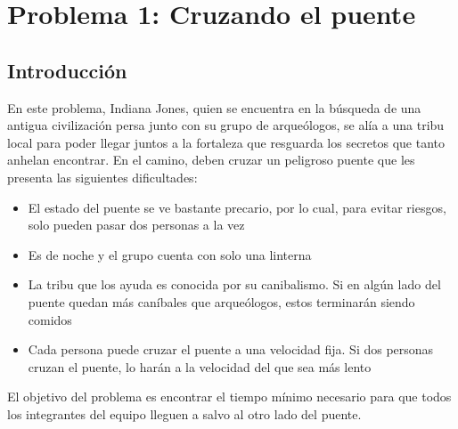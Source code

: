 \section{Problema 1: Cruzando el puente}

\subsection{Introducción}
	En este problema, Indiana Jones, quien se encuentra en la búsqueda de una antigua civilización persa junto con su grupo de arqueólogos, se alía a una tribu local para poder llegar juntos a la fortaleza que resguarda los secretos que tanto anhelan encontrar. En el camino, deben cruzar un peligroso puente que les presenta las siguientes dificultades:
	\begin{itemize}
	\item El estado del puente se ve bastante precario, por lo cual, para evitar riesgos, solo pueden pasar dos personas a la vez
	\item Es de noche y el grupo cuenta con solo una linterna
	\item La tribu que los ayuda es conocida por su canibalismo. Si en algún lado del puente quedan más caníbales que arqueólogos, estos terminarán siendo comidos
	\item Cada persona puede cruzar el puente a una velocidad fija. Si dos personas cruzan el puente, lo harán a la velocidad del que sea más lento
	\end{itemize}
	El objetivo del problema es encontrar el tiempo mínimo necesario para que todos los integrantes del equipo lleguen a salvo al otro lado del puente.
	